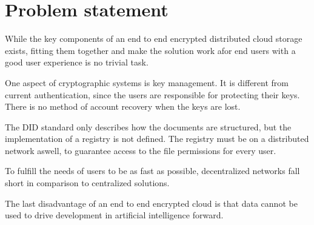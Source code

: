 \section{Problem statement}

While the key components of an end to end encrypted
distributed cloud storage exists, fitting them
together and make the solution work afor end users
with a good user experience is no trivial task.

One aspect of cryptographic systems is key management.
It is different from current authentication, since
the users are responsible for protecting their keys.
There is no method of account recovery when the keys
are lost.

The DID standard only describes how the documents
are structured, but the implementation of a
registry is not defined. The registry must be
on a distributed network aswell, to guarantee
access to the file permissions for every user.

To fulfill the needs of users to be as fast
as possible, decentralized networks fall short
in comparison to centralized solutions.

The last disadvantage of an end to end encrypted
cloud is that data cannot be used to drive
development in artificial intelligence forward.
